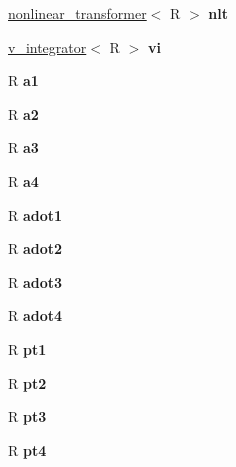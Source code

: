 \begin{DoxyCompactItemize}
\item 
\hypertarget{classrk4_a214560be9771a0fd1e1d3450685da9c5}{
\hyperlink{classnonlinear__transformer}{nonlinear\_\-transformer}$<$ R $>$ {\bfseries nlt}}
\label{classrk4_a214560be9771a0fd1e1d3450685da9c5}

\item 
\hypertarget{classrk4_a5e52ad362e80169cc3f23b1c0f3a7a4f}{
\hyperlink{classv__integrator}{v\_\-integrator}$<$ R $>$ {\bfseries vi}}
\label{classrk4_a5e52ad362e80169cc3f23b1c0f3a7a4f}

\item 
\hypertarget{classrk4_a765791d03fef48a8f9593eaca27defc8}{
R {\bfseries a1}}
\label{classrk4_a765791d03fef48a8f9593eaca27defc8}

\item 
\hypertarget{classrk4_acfeb66ce99e18d056afcaa505d3b7a96}{
R {\bfseries a2}}
\label{classrk4_acfeb66ce99e18d056afcaa505d3b7a96}

\item 
\hypertarget{classrk4_a7e382e7de3e229aa630f9db784606132}{
R {\bfseries a3}}
\label{classrk4_a7e382e7de3e229aa630f9db784606132}

\item 
\hypertarget{classrk4_a8a815689314b092fa0efd0765a3ad72e}{
R {\bfseries a4}}
\label{classrk4_a8a815689314b092fa0efd0765a3ad72e}

\item 
\hypertarget{classrk4_ae4b5442df2eaad12af507fc6b6cc39f8}{
R {\bfseries adot1}}
\label{classrk4_ae4b5442df2eaad12af507fc6b6cc39f8}

\item 
\hypertarget{classrk4_a879967a2a1270776afa585f5850c727f}{
R {\bfseries adot2}}
\label{classrk4_a879967a2a1270776afa585f5850c727f}

\item 
\hypertarget{classrk4_a350891ddc4b25427b0079ab2fdcbe4a1}{
R {\bfseries adot3}}
\label{classrk4_a350891ddc4b25427b0079ab2fdcbe4a1}

\item 
\hypertarget{classrk4_a07c2ff2eacda1d97394b3dee74229cae}{
R {\bfseries adot4}}
\label{classrk4_a07c2ff2eacda1d97394b3dee74229cae}

\item 
\hypertarget{classrk4_aed79efad1fa1ea909519e1a6014534ed}{
R {\bfseries pt1}}
\label{classrk4_aed79efad1fa1ea909519e1a6014534ed}

\item 
\hypertarget{classrk4_afe0e73a59a9fbf83b4ad4d712a6c174f}{
R {\bfseries pt2}}
\label{classrk4_afe0e73a59a9fbf83b4ad4d712a6c174f}

\item 
\hypertarget{classrk4_af6d1c9355312c55dfc0d16655c267149}{
R {\bfseries pt3}}
\label{classrk4_af6d1c9355312c55dfc0d16655c267149}

\item 
\hypertarget{classrk4_a985405ea783dcb3c49a3675c98378012}{
R {\bfseries pt4}}
\label{classrk4_a985405ea783dcb3c49a3675c98378012}

\end{DoxyCompactItemize}
